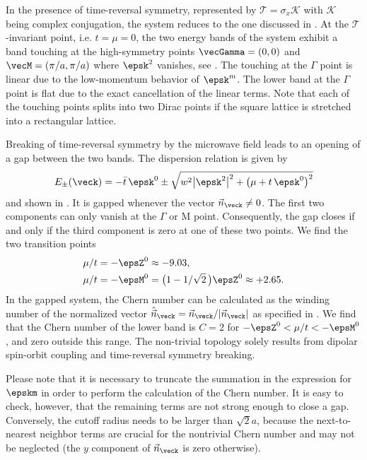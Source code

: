 In the presence of time-reversal symmetry, represented by $\mathcal{T}=\sigma_x \mathcal{K}$ with $\mathcal{K}$ being complex conjugation, the system reduces to the one discussed in .
At the $\mathcal{T}$-invariant point, i.e. $t=\mu=0$, the two energy bands of the system exhibit a band touching at the high-symmetry points $\vecGamma=(0,0)$ and $\vecM=(\pi/a, \pi/a)$ where $\epsk^2$ vanishes, see .
The touching at the $\Gamma$ point is linear due to the low-momentum behavior of $\epsk^m$.
The lower band at the $\Gamma$ point is flat due to the exact cancellation of the linear terms.
Note that each of the touching points splits into two Dirac points if the square lattice is stretched into a rectangular lattice.

Breaking of time-reversal symmetry by the microwave field leads to an opening of a gap between the two bands.
The dispersion relation is given by
\begin{align}
    E_\pm(\veck)=- \bar{t}\, \epsk^0 \pm \sqrt{w^2 \big|\epsk^2\big|^2+\big(\mu+t\, \epsk^0\big)^2}
\end{align}
and shown in .
It is gapped whenever the vector $\vec{n}_{\veck}\ne 0$.
The first two components can only vanish at the $\Gamma$ or $\text{M}$ point.
Consequently, the gap closes if and only if the third component is zero at one of these two points.
We find the two transition points
\begin{align}
    \mu/t &= -\epsZ^0 \approx -9.03, \\
    \mu/t &= -\epsM^0 = \big(1-1/\sqrt{2}\,\big)\epsZ^0 \approx +2.65.
\end{align}
In the gapped system, the Chern number can be calculated as the winding number of the normalized vector $\hat{\vec{n}}_\veck = \vec{n}_\veck/|\vec{n}_\veck|$ as specified in .
We find that the Chern number of the lower band is $C=2$ for $-\epsZ^0 < \mu/t < -\epsM^0$, and zero outside this range.
The non-trivial topology solely results from dipolar spin-orbit coupling and time-reversal symmetry breaking.

Please note that it is necessary to truncate the summation in the expression for $\epskm$ in order to perform the calculation of the Chern number.
It is easy to check, however, that the remaining terms are not strong enough to close a gap.
Conversely, the cutoff radius needs to be larger than $\sqrt{2}a$, because the next-to-nearest neighbor terms are crucial for the nontrivial Chern number and may not be neglected (the $y$ component of $\vec{n}_\veck$ is zero otherwise).

